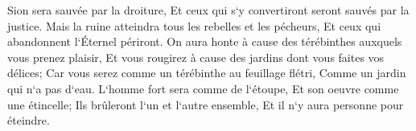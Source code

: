 \verse Sion sera sauvée par la droiture, Et ceux qui s`y convertiront seront sauvés par la justice. 
\verse Mais la ruine atteindra tous les rebelles et les pécheurs, Et ceux qui abandonnent l`Éternel périront. 
\verse On aura honte à cause des térébinthes auxquels vous prenez plaisir, Et vous rougirez à cause des jardins dont vous faites vos délices; 
\verse Car vous serez comme un térébinthe au feuillage flétri, Comme un jardin qui n`a pas d`eau. 
\verse L`homme fort sera comme de l`étoupe, Et son oeuvre comme une étincelle; Ils brûleront l`un et l`autre ensemble, Et il n`y aura personne pour éteindre. 

